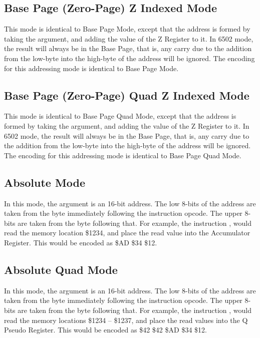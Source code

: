 \subsection{Base Page (Zero-Page) Z Indexed Mode}

This mode is identical to Base Page Mode, except that the address is formed by taking the
argument, and adding the value of the Z Register to it.  In 6502 mode, the result will always
be in the Base Page, that is, any carry due to the addition from the low-byte into the high-byte
of the address will be ignored.  The encoding for this addressing mode is identical to Base Page
Mode.

\subsection{Base Page (Zero-Page) Quad Z Indexed Mode}

This mode is identical to Base Page Quad Mode, except that the address is formed by taking the
argument, and adding the value of the Z Register to it.  In 6502 mode, the result will always
be in the Base Page, that is, any carry due to the addition from the low-byte into the high-byte
of the address will be ignored.  The encoding for this addressing mode is identical to Base Page Quad
Mode.

\subsection{Absolute Mode}

In this mode, the argument is an 16-bit address.  The low 8-bits of the address are taken from
the byte immediately following the instruction opcode. The upper 8-bits are taken from the
byte following that.  For example, the instruction , would read the
memory location \$1234, and place the read value into the Accumulator Register.  This would
be encoded as \$AD \$34 \$12.

\subsection{Absolute Quad Mode}

In this mode, the argument is an 16-bit address.  The low 8-bits of the address are taken from
the byte immediately following the instruction opcode. The upper 8-bits are taken from the
byte following that.  For example, the instruction , would read the
memory locations \$1234 -- \$1237, and place the read values into the Q Pseudo Register.  This would
be encoded as \$42 \$42 \$AD \$34 \$12.

